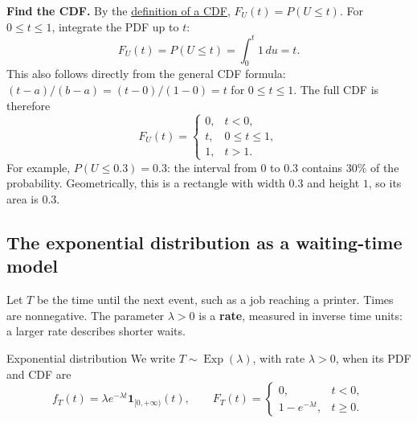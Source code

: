\documentclass[a4paper,12pt,oneside]{report}
\begin{document}
\textbf{Find the CDF.} By the
\hyperref[def:cdf]{definition of a CDF}, $F_U(t)=P(U\leq t)$.
For $0\leq t\leq1$, integrate the PDF up to $t$:
\[
  \boxed{F_U(t)=P(U\leq t)=\int_0^t1\,du=t.}
\]
This also follows directly from the general CDF formula:
$(t-a)/(b-a)=(t-0)/(1-0)=t$ for $0\leq t\leq1$.
The full CDF is therefore
\[
  F_U(t)=
  \begin{cases}
    0, & t<0,\\
    t, & 0\leq t\leq1,\\
    1, & t>1.
  \end{cases}
\]
For example, $P(U\leq0.3)=0.3$: the interval from $0$ to $0.3$
contains $30\%$ of the probability. Geometrically, this is a
rectangle with width $0.3$ and height $1$, so its area is $0.3$.
\begin{center}
\end{center}

\subsection{The exponential distribution as a waiting-time model}
\label{sec:exponential-distribution}

Let $T$ be the time until the next event, such as a job reaching a printer. Times are
nonnegative. The parameter $\lambda>0$ is a \textbf{rate}, measured
in inverse time units: a larger rate describes shorter waits.

\begin{frameddefn}{Exponential distribution}
We write $T\sim\operatorname{Exp}(\lambda)$, with rate $\lambda>0$,
when its PDF and CDF are
\[
  f_T(t)=\lambda e^{-\lambda t}\mathbf1_{[0,+\infty)}(t),
  \qquad
  F_T(t)=
  \begin{cases}
    0,&t<0,\\
    1-e^{-\lambda t},&t\geq0.
  \end{cases}
\]
\end{frameddefn}
\end{document}
